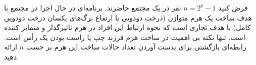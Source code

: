 \EXERCISE
فرض کنید
$n = 2^k -1$
نفر در یک مجتمع حاضرند. برنامه‌ای در حال اجرا در مجتمع با هدف ساخت یک هرم متوازن (درخت دودویی با ارتفاع برگ‌های یکسان درخت دودویی کامل) با هدف تجاری است که نحوه ارتباط این افراد در هرم تاثیرگذار و متمایز کننده است. تنها نکته بی اهمیت در ساخت هرم فرزند چپ یا راست بودن یک ‫رأس‬ است. رابطه‌ای بازگشتی برای بدست آوردن تعداد حالات ساخت این هرم بر حسب
$n$
‫ارائه‬ دهید.